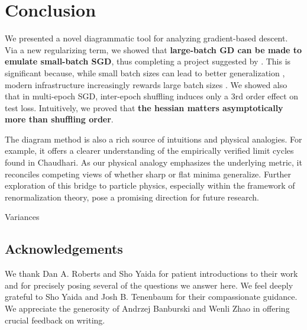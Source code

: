 \documentclass{article}
\begin{document}

\section{Conclusion}
    We presented a novel diagrammatic tool for analyzing gradient-based
    descent.  Via a new regularizing term, we showed that {\bf
    large-batch GD can be made to emulate small-batch SGD}, thus completing a
    project suggested by \citet{ro18}.  This is significant because, while
    small batch sizes can lead to better generalization \citep{bo91}, modern
    infrastructure increasingly rewards large batch sizes \citep{go18}.      
    We showed also that in multi-epoch SGD, inter-epoch shuffling induces only
    a $3$rd order effect on test loss.  Intuitively, we proved that {\bf the
    hessian matters asymptotically more than  shuffling order}.

    The diagram method is also a rich source of intuitions and physical
    analogies.  For example, it offers a clearer understanding of the
    empirically verified limit cycles found in Chaudhari.  As our physical
    analogy emphasizes the underlying metric, it reconciles competing views
    of whether sharp or flat minima generalize.  Further exploration of this
    bridge to particle physics, especially within the framework of
    renormalization theory, pose a promising direction for future research.

    Variances


\subsection{Acknowledgements}
    We thank Dan A. Roberts and Sho Yaida for patient introductions to their
    work and for precisely posing several of the questions we answer here.  We
    feel deeply grateful to Sho Yaida and Josh B. Tenenbaum for their
    compassionate guidance.  We appreciate the generosity of
        Andrzej Banburski
        and
        Wenli Zhao
    in offering crucial feedback on writing.

\end{document}
